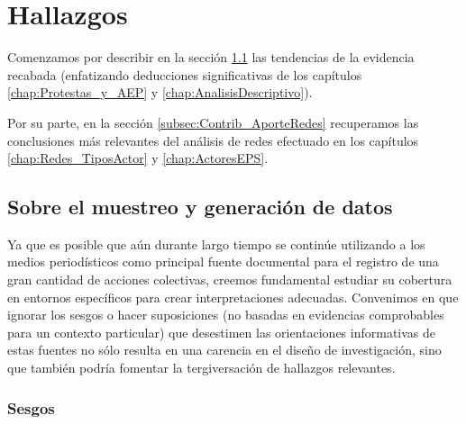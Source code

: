 \documentclass[letterpaper, 11pt]{book}
\theoremstyle{definition}
\theoremstyle{remark}
\begin{document}
\section{Hallazgos}
\label{sec:Contribuciones}



Comenzamos por describir en la sección \ref{subsec:Contrib_Muestreo} las tendencias de la evidencia recabada (enfatizando deducciones significativas de los capítulos \ref{chap:Protestas_y_AEP} y \ref{chap:AnalisisDescriptivo}). 

Por su parte, en la sección \ref{subsec:Contrib_AporteRedes} recuperamos las conclusiones más relevantes del análisis de redes efectuado en los capítulos \ref{chap:Redes_TiposActor} y \ref{chap:ActoresEPS}.



\subsection{Sobre el muestreo y generación de datos}
\label{subsec:Contrib_Muestreo}

Ya que es posible que aún durante largo tiempo se continúe utilizando a los medios periodísticos como principal fuente documental para el registro de una gran cantidad de acciones colectivas, creemos fundamental estudiar su cobertura en entornos específicos para crear interpretaciones adecuadas. 
Convenimos en que ignorar los sesgos o hacer suposiciones (no basadas en evidencias comprobables para un contexto particular) que desestimen las orientaciones informativas de estas fuentes no sólo resulta en una carencia en el diseño de investigación, sino que también podría fomentar la tergiversación de hallazgos relevantes. 


\subsubsection{Sesgos}
\label{subsub_conclusion_dataSesgos}
\end{document}
